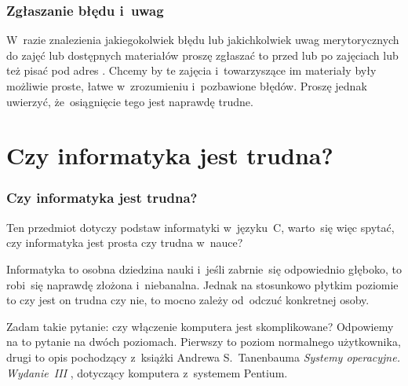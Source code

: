 \documentclass[10pt,t]{beamer}
\begin{document}
\begin{frame}
  \frametitle{Zgłaszanie błędu i~uwag}


  W~razie znalezienia jakiegokolwiek błędu lub jakichkolwiek uwag
  merytorycznych do zajęć lub dostępnych materiałów proszę zgłaszać to
  przed lub po zajęciach lub też pisać pod adres \email. Chcemy by te
  zajęcia i~towarzyszące im materiały były możliwie proste, łatwe
  w~zrozumieniu i~pozbawione błędów. Proszę jednak uwierzyć, że~osiągnięcie
  tego jest naprawdę trudne.

\end{frame}










\section{Czy informatyka jest trudna?}



\begin{frame}
  \frametitle{Czy informatyka jest trudna?}


  Ten przedmiot dotyczy podstaw informatyki w~języku~C, warto~się
  więc spytać, czy informatyka jest prosta czy trudna w~nauce?

  Informatyka to osobna dziedzina nauki i~jeśli zabrnie~się odpowiednio
  głęboko, to robi~się naprawdę złożona i~niebanalna. Jednak na stosunkowo
  płytkim poziomie to czy jest on trudna czy nie, to mocno zależy od~odczuć
  konkretnej osoby.

  Zadam takie pytanie: czy włączenie komputera jest skomplikowane?
  Odpowiemy na to pytanie na dwóch poziomach. Pierwszy to poziom normalnego
  użytkownika, drugi to opis pochodzący z~książki Andrewa S.~Tanenbauma
  \textit{Systemy operacyjne. Wydanie~III}
  \parencite{Tannenbaum-Systemy-Operacyjne-Wydanie-III-Pub-2013}, dotyczący
  komputera z~systemem Pentium.

\end{frame}
\end{document}
